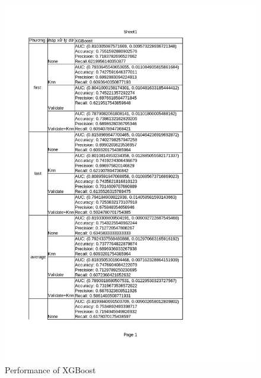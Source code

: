 \documentclass[../main.tex]{subfiles}
\begin{document}
 \begin{figure}[H]
    \centering
    \includegraphics[width=\textwidth]{Figure/KidneyResultLimit_XGBoost.png}
    \caption{Performance of XGBoost}
    \label{fig:KidneyResultLimit_XGBoost}
\end{figure}
\end{document}
